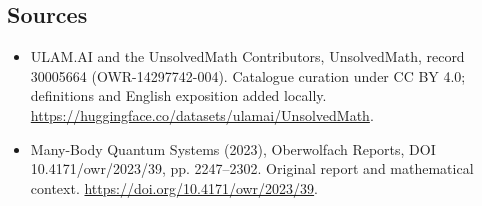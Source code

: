 \documentclass[11pt]{article}
\begin{document}
\subsection{Sources}
\begin{itemize}
\item[\hypertarget{source:30005664:1}{S1}] ULAM.AI and the UnsolvedMath Contributors, UnsolvedMath, record 30005664 (OWR-14297742-004). Catalogue curation under CC BY 4.0; definitions and English exposition added locally.
\url{https://huggingface.co/datasets/ulamai/UnsolvedMath}.
\item[\hypertarget{source:30005664:2}{S2}] Many-Body Quantum Systems (2023), Oberwolfach Reports, DOI 10.4171/owr/2023/39, pp. 2247--2302. Original report and mathematical context.
\url{https://doi.org/10.4171/owr/2023/39}.
\end{itemize}
\label{end:30005664}
\end{document}

